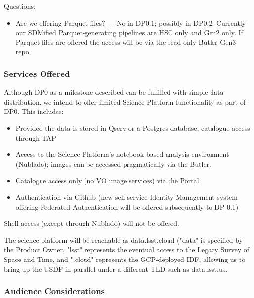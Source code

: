 Questions:

\begin{itemize}

\item Are we offering Parquet files? --- No in DP0.1; possibly in DP0.2. Currently our SDMified Parquet-generating pipelines are HSC only and Gen2 only. If Parquet files are offered the access will be via the read-only Butler Gen3 repo.


\end{itemize}

\subsubsection{Services Offered}

Although DP0 as a milestone described  can be fulfilled with simple data distribution, we intend to offer limited Science Platform functionality as part of DP0. This includes:

\begin{itemize}

\item Provided the data is stored in Qserv or a Postgres database, catalogue access through TAP

\item Access to the Science Platform's notebook-based analysis environment (Nublado); images can be accessed pragmatically via the Butler.

\item Catalogue access only (no VO image services) via the Portal

\item Authentication via Github (new self-service Identity Management system offering Federated Authentication will be offered subsequently to DP 0.1)

\end{itemize}

Shell access (except through Nublado) will not be offered.

The science platform will be reachable as data.lsst.cloud ("data" is specified by the Product Owner, "lsst" represents the eventual access to the Legacy Survey of Space and Time, and ".cloud" represents the GCP-deployed IDF, allowing us to bring up the USDF in parallel under a different TLD such as data.lsst.us.

\subsubsection{Audience Considerations}

